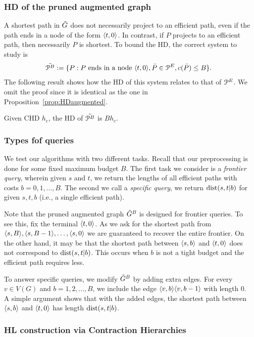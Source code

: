 \subsubsection{HD of the pruned augmented graph}

A shortest path in $\tilde G$ does not necessarily project to an efficient path, even if the path ends in a node of the form $\langle t,0\rangle$.
In contrast, if $P$ projects to an efficient path, then necessarily $P$ is shortest. 
To bound the HD, the correct system to study is
\[
\tilde{\mathcal{P}^B}:=\{P: P\text{ ends in a node }\langle t,0\rangle, \bar P\in \mathcal{P}^E, c(\bar P)\leq B \}.
\]
The following result shows how the HD of this system relates to that of $\mathcal{P}^E$.
We omit the proof since it is identical as the one in Proposition~\ref{prop:HDaugmented}.
\begin{proposition}
Given CHD $h_c$, the HD of $\tilde{\mathcal{P}^B}$ is $Bh_c$.
\end{proposition}

\subsubsection{Types fof queries}

We test our algorithms with two different tasks.
Recall that our preprocessing is done for some fixed maximum budget $B$.
The first task we consider is a \emph{frontier query}, wherein given $s$ and $t$, we return the lengths of all efficient paths with costs $b=0,1,\ldots,B$.
The second we call a \emph{specific query}, we return $\mbox{dist}(s,t|b)$ for given $s,t,b$ (i.e., a single efficient path).

Note that the pruned augmented graph $\tilde G^B$ is designed for frontier queries.
To see this, fix the terminal $\langle t,0\rangle$.
As we ask for the shortest path from $\langle s,B\rangle,\langle s,B-1\rangle,\ldots,\langle s,0\rangle$ we are guaranteed to recover the entire frontier.
On the other hand, it may be that the shortest path between $\langle s,b\rangle$ and $\langle t,0\rangle$ does not correspond to $\mbox{dist}(s,t|b)$.
This occurs when $b$ is not a tight budget and the efficient path requires less.

To answer specific queries, we modify $\tilde G^B$ by adding extra edges.
For every $v\in V(G)$ and $b=1,2,\ldots,B$, we include the edge $\langle v,b\rangle\langle v,b-1\rangle$ with length $0$.
A simple argument shows that with the added edges, the shortest path between $\langle s,b\rangle$ and $\langle t,0\rangle$ has length $\mbox{dist}(s,t|b)$.

\subsubsection{HL construction via Contraction Hierarchies}


